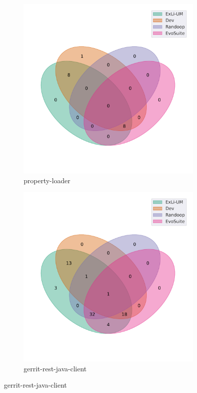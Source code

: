 \begin{figure}[t]\ContinuedFloat
\begin{subfigure}[b]{0.45\textwidth}
\includegraphics[width=\textwidth]{figures/venn/TNG_property-loader-venn.pdf}
\vspace{-10pt}
\caption{property-loader}
\label{fig:venn-TNG_property-loader}
\end{subfigure}
\hfill
\begin{subfigure}[b]{0.45\textwidth}
\includegraphics[width=\textwidth]{figures/venn/uwolfer_gerrit-rest-java-client-venn.pdf}
\vspace{-10pt}
\caption{gerrit-rest-java-client}
\label{fig:venn-uwolfer_gerrit-rest-java-client}
\end{subfigure}
\end{figure}
